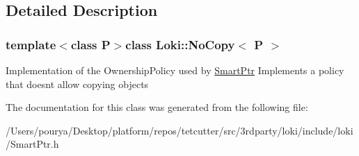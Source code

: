 \subsection{Detailed Description}
\subsubsection*{template$<$class P$>$class Loki\+::\+No\+Copy$<$ P $>$}

Implementation of the Ownership\+Policy used by \hyperlink{classLoki_1_1SmartPtr}{Smart\+Ptr} Implements a policy that doesn\textquotesingle{}t allow copying objects 

The documentation for this class was generated from the following file\+:\begin{DoxyCompactItemize}
\item 
/\+Users/pourya/\+Desktop/platform/repos/tetcutter/src/3rdparty/loki/include/loki/Smart\+Ptr.\+h\end{DoxyCompactItemize}
